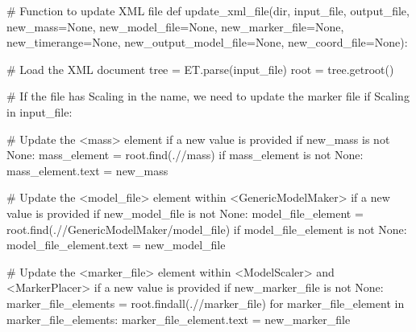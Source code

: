 \documentclass[
  letterpaper,
  DIV=11,
  numbers=noendperiod]{scrreprt}
\newenvironment{Shaded}{\begin{snugshade}}{\end{snugshade}}
\newcommand{\BuiltInTok}[1]{\textcolor[rgb]{0.00,0.23,0.31}{#1}}
\newcommand{\CommentTok}[1]{\textcolor[rgb]{0.37,0.37,0.37}{#1}}
\newcommand{\ControlFlowTok}[1]{\textcolor[rgb]{0.00,0.23,0.31}{#1}}
\newcommand{\KeywordTok}[1]{\textcolor[rgb]{0.00,0.23,0.31}{#1}}
\newcommand{\NormalTok}[1]{\textcolor[rgb]{0.00,0.23,0.31}{#1}}
\newcommand{\OperatorTok}[1]{\textcolor[rgb]{0.37,0.37,0.37}{#1}}
\newcommand{\StringTok}[1]{\textcolor[rgb]{0.13,0.47,0.30}{#1}}
\newcommand{\VariableTok}[1]{\textcolor[rgb]{0.07,0.07,0.07}{#1}}
\begin{document}
\begin{Shaded}
\begin{Highlighting}[]
\CommentTok{\# Function to update XML file}
\KeywordTok{def}\NormalTok{ update\_xml\_file(}\BuiltInTok{dir}\NormalTok{, input\_file, output\_file, new\_mass}\OperatorTok{=}\VariableTok{None}\NormalTok{, new\_model\_file}\OperatorTok{=}\VariableTok{None}\NormalTok{, new\_marker\_file}\OperatorTok{=}\VariableTok{None}\NormalTok{, new\_timerange}\OperatorTok{=}\VariableTok{None}\NormalTok{, new\_output\_model\_file}\OperatorTok{=}\VariableTok{None}\NormalTok{, new\_coord\_file}\OperatorTok{=}\VariableTok{None}\NormalTok{):}

    \CommentTok{\# Load the XML document}
\NormalTok{    tree }\OperatorTok{=}\NormalTok{ ET.parse(input\_file)}
\NormalTok{    root }\OperatorTok{=}\NormalTok{ tree.getroot()}

    \CommentTok{\# If the file has Scaling in the name, we need to update the marker file}
    \ControlFlowTok{if} \StringTok{\textquotesingle{}Scaling\textquotesingle{}} \KeywordTok{in}\NormalTok{ input\_file:}
        
        \CommentTok{\# Update the \textless{}mass\textgreater{} element if a new value is provided}
        \ControlFlowTok{if}\NormalTok{ new\_mass }\KeywordTok{is} \KeywordTok{not} \VariableTok{None}\NormalTok{:}
\NormalTok{            mass\_element }\OperatorTok{=}\NormalTok{ root.find(}\StringTok{\textquotesingle{}.//mass\textquotesingle{}}\NormalTok{)}
            \ControlFlowTok{if}\NormalTok{ mass\_element }\KeywordTok{is} \KeywordTok{not} \VariableTok{None}\NormalTok{:}
\NormalTok{                mass\_element.text }\OperatorTok{=}\NormalTok{ new\_mass}

        \CommentTok{\# Update the \textless{}model\_file\textgreater{} element within \textless{}GenericModelMaker\textgreater{} if a new value is provided}
        \ControlFlowTok{if}\NormalTok{ new\_model\_file }\KeywordTok{is} \KeywordTok{not} \VariableTok{None}\NormalTok{:}
\NormalTok{            model\_file\_element }\OperatorTok{=}\NormalTok{ root.find(}\StringTok{\textquotesingle{}.//GenericModelMaker/model\_file\textquotesingle{}}\NormalTok{)}
            \ControlFlowTok{if}\NormalTok{ model\_file\_element }\KeywordTok{is} \KeywordTok{not} \VariableTok{None}\NormalTok{:}
\NormalTok{                model\_file\_element.text }\OperatorTok{=}\NormalTok{ new\_model\_file}

        \CommentTok{\# Update the \textless{}marker\_file\textgreater{} element within \textless{}ModelScaler\textgreater{} and \textless{}MarkerPlacer\textgreater{} if a new value is provided}
        \ControlFlowTok{if}\NormalTok{ new\_marker\_file }\KeywordTok{is} \KeywordTok{not} \VariableTok{None}\NormalTok{:}
\NormalTok{            marker\_file\_elements }\OperatorTok{=}\NormalTok{ root.findall(}\StringTok{\textquotesingle{}.//marker\_file\textquotesingle{}}\NormalTok{)}
            \ControlFlowTok{for}\NormalTok{ marker\_file\_element }\KeywordTok{in}\NormalTok{ marker\_file\_elements:}
\NormalTok{                marker\_file\_element.text }\OperatorTok{=}\NormalTok{ new\_marker\_file}


\end{Highlighting}
\end{Shaded}
\end{document}
